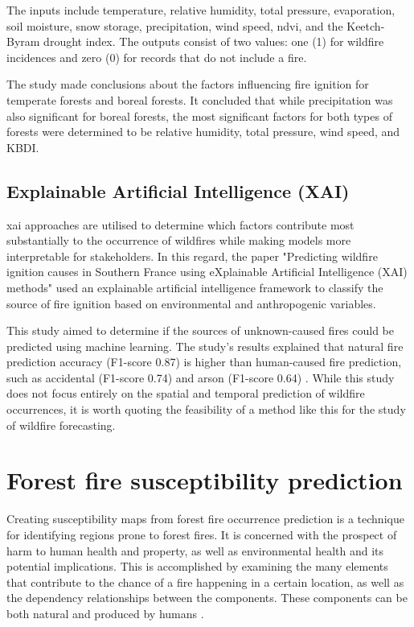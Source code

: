 The inputs include temperature, relative humidity, total pressure, evaporation, soil moisture, snow storage, precipitation, wind speed, \gls{ndvi}, and the Keetch-Byram drought index. The outputs consist of two values: one (1) for wildfire incidences and zero (0) for records that do not include a fire.

The study made conclusions about the factors influencing fire ignition for temperate forests and boreal forests. It concluded that while precipitation was also significant for boreal forests, the most significant factors for both types of forests were determined to be relative humidity, total pressure, wind speed, and KBDI.






\subsection{Explainable Artificial Intelligence (XAI)}
\gls{xai} approaches are utilised to determine which factors contribute most substantially to the occurrence of wildfires while making models more interpretable for stakeholders. In this regard, the paper "Predicting wildfire ignition causes in Southern France using eXplainable Artificial Intelligence (XAI) methods" \cite{bountzouklis2023predicting} used an explainable artificial intelligence framework to classify the source of fire ignition based on environmental and anthropogenic variables. 


This study aimed to determine if the sources of unknown-caused fires could be predicted using machine learning. The study's results explained that natural fire prediction accuracy (F1-score 0.87) is higher than human-caused fire prediction, such as accidental (F1-score 0.74) and arson (F1-score 0.64) \cite{bountzouklis2023predicting}. While this study does not focus entirely on the spatial and temporal prediction of wildfire occurrences, it is worth quoting the feasibility of a method like this for the study of wildfire forecasting.





\section{Forest fire susceptibility prediction}

Creating susceptibility maps from forest fire occurrence prediction is a technique for identifying regions prone to forest fires. It is concerned with the prospect of harm to human health and property, as well as environmental health and its potential implications. This is accomplished by examining the many elements that contribute to the chance of a fire happening in a certain location, as well as the dependency relationships between the components. These components can be both natural and produced by humans \cite{Sevinç2023}.

